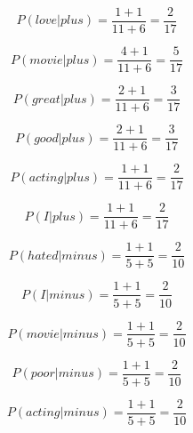 \begin{boxK}
    \begin{equation*}
        P(love | plus) = \frac{1 + 1}{11 + 6} = \frac{2}{17}  
    \end{equation*}

    \begin{equation*}
        P(movie | plus) = \frac{4 + 1}{11 + 6} = \frac{5}{17}  
    \end{equation*}

    \begin{equation*}
        P(great | plus) = \frac{2 + 1}{11 + 6}  = \frac{3}{17}  
    \end{equation*}

    \begin{equation*}
        P(good | plus) = \frac{2 + 1}{11 + 6} = \frac{3}{17}
    \end{equation*}

    \begin{equation*}
        P(acting | plus) = \frac{1 + 1}{11 + 6} = \frac{2}{17}    
    \end{equation*}

    \begin{equation*}
        P(I | plus) = \frac{1 + 1}{11 + 6} = \frac{2}{17}   
    \end{equation*}
    
\end{boxK}

\begin{boxK}
    \begin{equation*}
        P(hated | minus) = \frac{1 + 1}{5 + 5} = \frac{2}{10}
    \end{equation*}

    \begin{equation*}
        P(I | minus) = \frac{1 + 1}{5 + 5} = \frac{2}{10}
    \end{equation*}

    \begin{equation*}
        P(movie | minus) = \frac{1 + 1}{5 + 5} = \frac{2}{10}
    \end{equation*}

    \begin{equation*}
        P(poor | minus) = \frac{1 + 1}{5 + 5} = \frac{2}{10}
    \end{equation*}

    \begin{equation*}
        P(acting | minus) = \frac{1 + 1}{5 + 5} = \frac{2}{10}
    \end{equation*}
\end{boxK}

